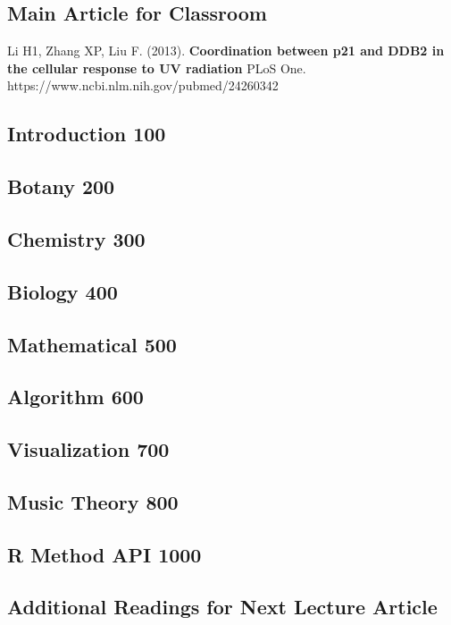 \documentclass[preprint, 9pt,times]{elsarticle}
\theoremstyle{definition}
\begin{document}

\begin{thebibliography}{00}
\footnotesize

\subsection{Main Article for Classroom}

Li H1, Zhang XP, Liu F. (2013). 
\newblock \textbf{Coordination between p21 and DDB2 in the cellular response to UV radiation }
\newblock PLoS One. https://www.ncbi.nlm.nih.gov/pubmed/24260342

\subsection{Introduction 100}

\subsection{Botany 200}

\subsection{Chemistry 300}

\subsection{Biology 400}

\subsection{Mathematical 500}

\subsection{Algorithm 600}

\subsection{Visualization 700}

\subsection{Music Theory 800}

\subsection{R Method API 1000}

\subsection{Additional Readings for Next Lecture Article}

\end{thebibliography}
\end{document}
